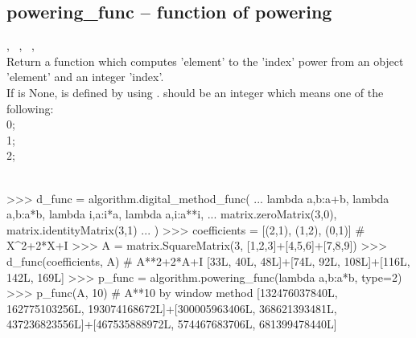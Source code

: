   \subsection{powering\_func -- function of powering}
   {%
     ,\ %
     ,\ %
     ,\ %
   }{%
   }\\
   \spacing
   \quad Return a function which computes 'element' to the 'index' power from an object 'element' and an integer 'index'.\\
   \spacing
   \quad If  is None,  is defined by using .
    should be an integer which means one of the following:\\
   0;\ \\
   1;\ \\
   2;\ \\
\\
%
\begin{ex}
>>> d_func = algorithm.digital_method_func(
... lambda a,b:a+b, lambda a,b:a*b, lambda i,a:i*a, lambda a,i:a**i, 
... matrix.zeroMatrix(3,0), matrix.identityMatrix(3,1)
... )
>>> coefficients = [(2,1), (1,2), (0,1)] # X^2+2*X+I
>>> A = matrix.SquareMatrix(3, [1,2,3]+[4,5,6]+[7,8,9])
>>> d_func(coefficients, A) # A**2+2*A+I
[33L, 40L, 48L]+[74L, 92L, 108L]+[116L, 142L, 169L]
>>> p_func = algorithm.powering_func(lambda a,b:a*b, type=2)
>>> p_func(A, 10) # A**10 by window method
[132476037840L, 162775103256L, 193074168672L]+[300005963406L, 368621393481L,
 437236823556L]+[467535888972L, 574467683706L, 681399478440L]

\end{ex}%
\C



